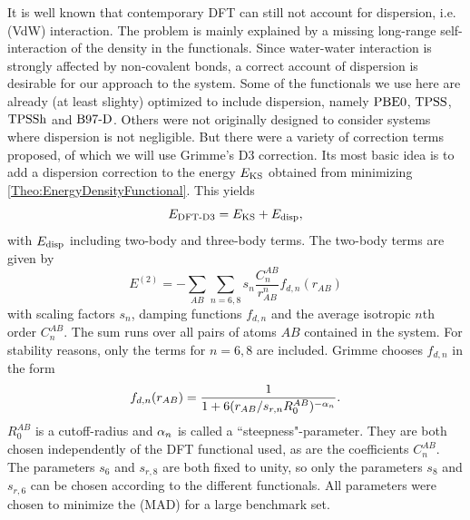 It is well known that contemporary DFT can still not account for dispersion, i.e.  (VdW)
interaction. 
The problem is mainly explained by a missing long-range self-interaction
of the density in the functionals.\cite{Kryachko2012} 
Since water-water interaction is strongly affected by non-covalent bonds, a correct
account of dispersion is desirable for our approach to the system. Some of the functionals
we use here are already (at least slighty) optimized to include dispersion,
namely $\text{PBE0}$, $\text{TPSS}$, $\text{TPSSh}$ and $\text{B97-D}$. Others were not originally designed to
consider systems where dispersion is not negligible. But there were a
variety of correction terms proposed, \cite{BeckeXDM2007,GrimmeDCorrection2010}
of which we will use Grimme's D3 correction. \cite{GrimmeD32011} Its most basic
idea is to add a dispersion correction to the energy $E_{\text{KS}}$ obtained
from minimizing \eqref{Theo:EnergyDensityFunctional}.
This yields
\begin{equation}
E_{\text{DFT-D3}}=E_{\text{KS}}+E_{\text{disp}},
\end{equation}  
with $E_{\text{disp}}$ including two-body and three-body terms. The two-body terms
are given by
\begin{equation}
E^{(2)}=-\sum_{AB}\sum_{n=6,8} s_n \frac {C_n^{AB}}{r_{AB}^n} f_{d,n}(r_{AB})
\end{equation}
with scaling factors $s_n$, damping functions $f_{d,n}$ and the average isotropic
$n$th order  $C_n^{AB}$. The sum runs over
all pairs of atoms $AB$ contained in the system. For stability reasons, only the terms
for $n=6,8$ are included. 
Grimme chooses $f_{d,n}$ in the form
\begin{equation}
f_{d,n}(r_{AB})=\frac 1 {1+6(r_{AB}/s_{r,n}R_0^{AB})^{-\alpha_n}}.
\end{equation}
$R_0^{AB}$ is a cutoff-radius and $\alpha_n$ is called a ``steepness"-parameter. They are both
chosen independently of the DFT functional used, as are the coefficients
$C_n^{AB}$. The parameters $s_6$ and $s_{r,8}$ are both fixed to unity, so only the parameters
$s_8$ and $s_{r,6}$ can be chosen according to the different functionals. All
parameters were chosen to minimize the  (MAD) for
a large benchmark set.\cite{GrimmeD32011}

